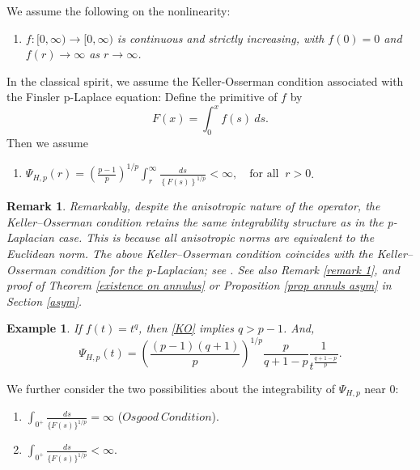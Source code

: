 \documentclass[11pt]{amsart}
\makeatletter
\newtheorem{remark}{Remark}
\newtheorem{example}{Example}[section]
\newcommand{\myitem}[1]{%
\medskip \item[#1]\protected@edef\@currentlabel{#1}%
}
\numberwithin{equation}{section}
\makeatother
\begin{document}
We assume the following on the nonlinearity:
\begin{enumerate}
    \myitem {$\textbf{(F)}$}\label{a1}
    \textit{$f:[0,\infty)\to [0,\infty)$ is continuous and strictly increasing, with $f(0)=0$ and $f(r)\to \infty$ as $r\to\infty$.}
\end{enumerate}
In the classical spirit, we assume the Keller-Osserman condition associated with the Finsler p-Laplace equation: Define the primitive of $f$ by
\begin{equation}\label{eqn primitive of f}
    F(x)=\int_{0}^{x}f(s)\ ds.
\end{equation}
Then we assume
\begin{enumerate}
    \myitem{$\textbf{(KO)}$} \label{KO}$ \Psi_{H,p}(r)=\left(\frac{p-1}{p}\right)^{1/p}\int_{r}^{\infty}\frac{ds}{\left\{F(s)\right\}^{1/p}}<\infty, \quad \text{for all }~ r>0$.
\end{enumerate}
\begin{remark}
    Remarkably, despite the anisotropic nature of the operator, the Keller–Osserman condition retains the same integrability structure as in the p-Laplacian case. This is because all anisotropic norms are equivalent to the Euclidean norm. The above Keller–Osserman condition coincides with the Keller–Osserman condition for the p-Laplacian; see \cite{DattaIndro2026}. See also Remark \ref{remark 1}, and proof of Theorem \ref{existence on annulus} or Proposition \ref{prop annuls asym} in Section \ref{asym}. 
    \end{remark}
    \begin{example}\label{example f=tq}
         If $f(t)=t^{q}$, then \ref{KO} implies $q>p-1$. And, 
    \begin{equation*}
        \Psi_{H,p}(t)= \left(\frac{(p-1)(q+1)}{p}\right)^{1/p}\frac{p}{q+1-p}\frac{1}{t^{\frac{q+1-p}{p}}}.
    \end{equation*}
    \end{example}
We further consider the two possibilities about the integrability of $\Psi_{H,p}$ near $0$:
\begin{enumerate}
        \myitem{$\textbf{(A1)}$}\label{i1} $\int_{0^{+}}\frac{ds}{\{F(s)\}^{1/p}}=\infty$ ($Osgood~ Condition$).
    \myitem{$\textbf{(A2)}$}\label{i2} $\int_{0^{+}}\frac{ds}{\{F(s)\}^{1/p}}<\infty$.
\end{enumerate}
\end{document}
